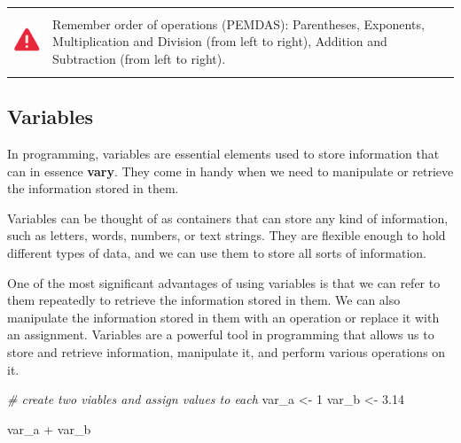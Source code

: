 \documentclass[
]{book}
\newenvironment{Shaded}{\begin{snugshade}}{\end{snugshade}}
\newcommand{\CommentTok}[1]{\textcolor[rgb]{0.56,0.35,0.01}{\textit{#1}}}
\newcommand{\DecValTok}[1]{\textcolor[rgb]{0.00,0.00,0.81}{#1}}
\newcommand{\FloatTok}[1]{\textcolor[rgb]{0.00,0.00,0.81}{#1}}
\newcommand{\NormalTok}[1]{#1}
\newcommand{\OtherTok}[1]{\textcolor[rgb]{0.56,0.35,0.01}{#1}}
\newcommand{\SpecialCharTok}[1]{\textcolor[rgb]{0.00,0.00,0.00}{#1}}
\begin{document}
\hfill\break

\begin{longtable}[]{@{}
  >{\raggedright\arraybackslash}p{}
  >{\raggedright\arraybackslash}p{}@{}}
\toprule\noalign{}
\endhead
\bottomrule\noalign{}
\endlastfoot
\includegraphics[width=\textwidth,height=0.70833in]{images/02.png} & Remember order of operations (PEMDAS): Parentheses, Exponents, Multiplication and Division (from left to right), Addition and Subtraction (from left to right). \textbar{} \\
\end{longtable}

\hfill\break

\hypertarget{variables}{%
\subsection{Variables}\label{variables}}

In programming, variables are essential elements used to store information that can in essence \textbf{vary}. They come in handy when we need to manipulate or retrieve the information stored in them.

Variables can be thought of as containers that can store any kind of information, such as letters, words, numbers, or text strings. They are flexible enough to hold different types of data, and we can use them to store all sorts of information.

One of the most significant advantages of using variables is that we can refer to them repeatedly to retrieve the information stored in them. We can also manipulate the information stored in them with an operation or replace it with an assignment. Variables are a powerful tool in programming that allows us to store and retrieve information, manipulate it, and perform various operations on it.

\begin{Shaded}
\begin{Highlighting}[]
\CommentTok{\# create two viables and assign values to each}
\NormalTok{var\_a }\OtherTok{\textless{}{-}} \DecValTok{1}
\NormalTok{var\_b }\OtherTok{\textless{}{-}} \FloatTok{3.14}

\NormalTok{var\_a }\SpecialCharTok{+}\NormalTok{ var\_b}
\end{Highlighting}
\end{Shaded}
\end{document}
